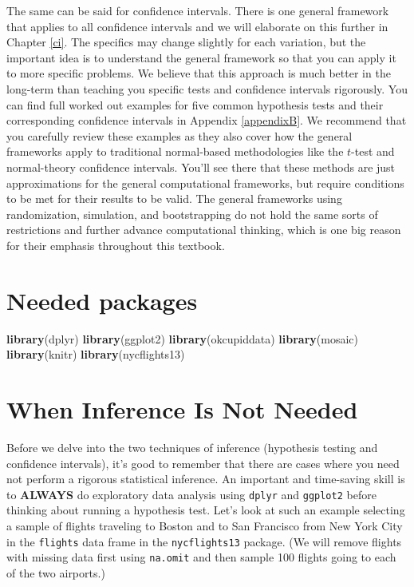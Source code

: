 \documentclass[]{tufte-book}
\newenvironment{Shaded}{\begin{snugshade}}{\end{snugshade}}
\newcommand{\KeywordTok}[1]{\textcolor[rgb]{0.13,0.29,0.53}{\textbf{{#1}}}}
\newcommand{\NormalTok}[1]{{#1}}
\begin{document}
The same can be said for confidence intervals. There is one general
framework that applies to all confidence intervals and we will elaborate
on this further in Chapter \ref{ci}. The specifics may change slightly
for each variation, but the important idea is to understand the general
framework so that you can apply it to more specific problems. We believe
that this approach is much better in the long-term than teaching you
specific tests and confidence intervals rigorously. You can find full
worked out examples for five common hypothesis tests and their
corresponding confidence intervals in Appendix \ref{appendixB}. We
recommend that you carefully review these examples as they also cover
how the general frameworks apply to traditional normal-based
methodologies like the \(t\)-test and normal-theory confidence
intervals. You'll see there that these methods are just approximations
for the general computational frameworks, but require conditions to be
met for their results to be valid. The general frameworks using
randomization, simulation, and bootstrapping do not hold the same sorts
of restrictions and further advance computational thinking, which is one
big reason for their emphasis throughout this textbook.

\section*{Needed packages}\label{needed-packages-3}

\begin{Shaded}
\begin{Highlighting}[]
\KeywordTok{library}\NormalTok{(dplyr)}
\KeywordTok{library}\NormalTok{(ggplot2)}
\KeywordTok{library}\NormalTok{(okcupiddata)}
\KeywordTok{library}\NormalTok{(mosaic)}
\KeywordTok{library}\NormalTok{(knitr)}
\KeywordTok{library}\NormalTok{(nycflights13)}
\end{Highlighting}
\end{Shaded}

\section{When Inference Is Not
Needed}\label{when-inference-is-not-needed}

Before we delve into the two techniques of inference (hypothesis testing
and confidence intervals), it's good to remember that there are cases
where you need not perform a rigorous statistical inference. An
important and time-saving skill is to \textbf{ALWAYS} do exploratory
data analysis using \texttt{dplyr} and \texttt{ggplot2} before thinking
about running a hypothesis test. Let's look at such an example selecting
a sample of flights traveling to Boston and to San Francisco from New
York City in the \texttt{flights} data frame in the
\texttt{nycflights13} package. (We will remove flights with missing data
first using \texttt{na.omit} and then sample 100 flights going to each
of the two airports.)
\end{document}
